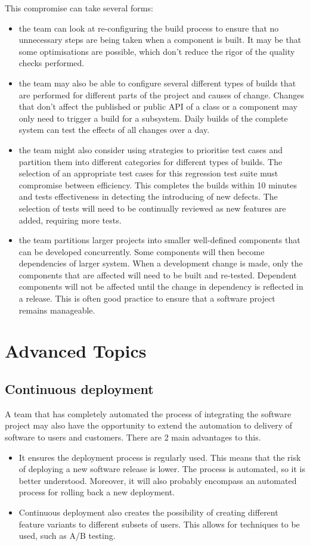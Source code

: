 \documentclass[a4paper, openany]{memoir}
\begin{document}
This compromise can take several forms:
\begin{itemize}
    \item the team can look at re-configuring the build process to ensure that no unnecessary steps are being taken when a component is built. It may be that some optimisations are possible, which don't reduce the rigor of the quality checks performed.
    \item the team may also be able to configure several different types of builds that are performed for different parts of the project and causes of change. Changes that don't affect the published or public API of a class or a component may only need to trigger a build for a subsystem. Daily builds of the complete system can test the effects of all changes over a day.
    \item the team might also consider using strategies to prioritise test cases and partition them into different categories for different types of builds. The selection of an appropriate test cases for this regression test suite must compromise between efficiency. This completes the builds within 10 minutes and tests effectiveness in detecting the introducing of new defects. The selection of tests will need to be continually reviewed as new features are added, requiring more tests.
    \item the team partitions larger projects into smaller well-defined components that can be developed concurrently. Some components will then become dependencies of larger system. When a development change is made, only the components that are affected will need to be built and re-tested. Dependent components will not be affected until the change in dependency is reflected in a release. This is often good practice to ensure that a software project remains manageable.
\end{itemize}

\section{Advanced Topics}
\subsection{Continuous deployment}
A team that has completely automated the process of integrating the software project may also have the opportunity to extend the automation to delivery of software to users and customers. There are 2 main advantages to this.
\begin{itemize}
    \item It ensures the deployment process is regularly used. This means that the risk of deploying a new software release is lower. The process is automated, so it is better understood. Moreover, it will also probably encompass an automated process for rolling back a new deployment.
    \item Continuous deployment also creates the possibility of creating different feature variants to different subsets of users. This allows for techniques to be used, such as A/B testing.
\end{itemize}
\end{document}
